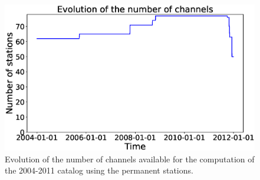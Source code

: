 \documentclass[draft]{agujournal2019}
\begin{document}
\begin{figure}
\noindent\includegraphics[width=\textwidth, trim={0cm 0cm 0cm 0cm},clip]{figures/timeline_perm.eps}
\caption{Evolution of the number of channels available for the computation of the 2004-2011 catalog using the permanent stations.}
\label{pngfiguresample}
\end{figure}
\end{document}
